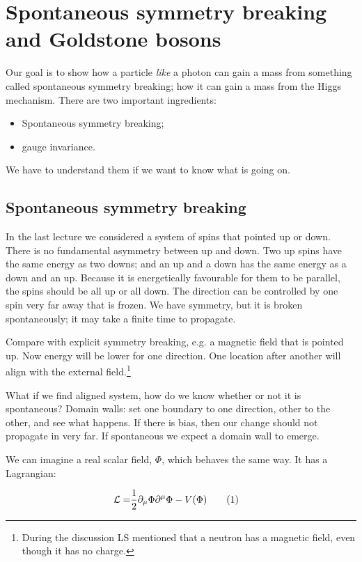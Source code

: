 \documentclass[]{article}
\newcommand\numberthis{\addtocounter{equation}{1}\tag{\theequation}}
\begin{document}
\section{Spontaneous symmetry breaking and Goldstone bosons}

Our goal is to show how a particle \emph{like} a photon can gain a mass from something called spontaneous symmetry breaking; how it can gain a mass from the Higgs mechanism. There are two important ingredients:

\begin{itemize}
	\item Spontaneous symmetry breaking;
	\item gauge invariance.
\end{itemize}
We have to understand them if we want to know what is going on.

\subsection{Spontaneous symmetry breaking}
In the last lecture we considered a system of spins that pointed up or down.
There is no fundamental asymmetry between up and down. Two up spins have the same energy as two downs; and an up and a down has the same energy as a down and an up. Because it is energetically favourable for them to be parallel, the spins should be all up or all down. The direction can be controlled by one spin very far away that is frozen. We have symmetry, but it is broken spontaneously; it may take a finite time to propagate.

Compare with explicit symmetry breaking, e.g. a magnetic field that is pointed up. Now energy will be lower for one direction. One location after another will align with the external field.\footnote{During the discussion LS mentioned that a neutron has a magnetic field, even though it has no charge.}

What if we find aligned system, how do we know whether or not it is spontaneous? Domain walls: set one boundary to one direction, other to the other, and see what happens. If there is bias, then our change should not propagate in very far. If spontaneous we expect a domain wall to emerge.

We can imagine a real scalar field, $\Phi$, which behaves the same way. It has a Lagrangian:

\begin{align*}
	\mathcal{L} =& \frac{1}{2} \partial_\mu \Phi \partial^\mu \Phi - V(\Phi) \numberthis \label{eq:spontaneous:symmetry:L}
\end{align*}
\end{document}
